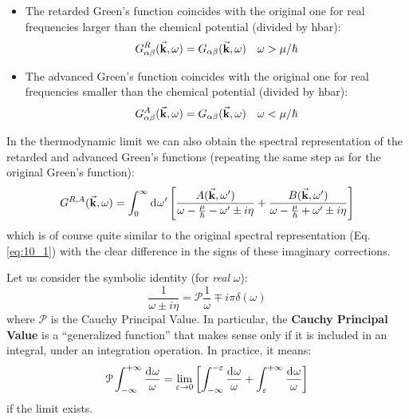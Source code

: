\documentclass[../main/main.tex]{subfiles}
\begin{document}
\begin{itemize}
\item The retarded Green's function coincides with the original one for real frequencies larger than the chemical potential (divided by hbar):
\begin{equation*}
  G_{\alpha \beta }^R (\va{k}, \omega ) = G_{\alpha \beta } (\va{k}, \omega ) \quad \omega > \mu /\hbar
\end{equation*}
\item The advanced Green's function coincides with the original one for real frequencies smaller than the chemical potential (divided by hbar):
\begin{equation*}
  G_{\alpha \beta }^A (\va{k}, \omega ) = G_{\alpha \beta } (\va{k}, \omega ) \quad \omega < \mu /\hbar
\end{equation*}
\end{itemize}
In the thermodynamic limit we can also obtain the spectral representation of the retarded and advanced Green's functions (repeating the same step as for the original Green's function):
\begin{equation}
  G^{R,A} (\va{k}, \omega ) = \int_{0}^{\infty } \dd[]{\omega'}
  \qty[ \frac{A(\va{k},\omega' )}{\omega - \frac{\mu }{\hbar } - \omega' \pm i \eta  }
  +
  \frac{B(\va{k},\omega' )}{\omega - \frac{\mu }{\hbar } + \omega' \pm i \eta  }]
  \label{eq:10_9}
\end{equation}
which is of course quite similar to the original spectral representation (Eq.\eqref{eq:10_1}) with the clear difference in the signs of these imaginary corrections.

Let us consider the symbolic identity (for \emph{real} \( \omega  \)): 
\begin{equation}
  \frac{1}{\omega \pm i \eta } = \mathcal{P} \frac{1}{\omega }\mp i \pi \delta (\omega )
  \label{eq:10_2}
\end{equation}
where \( \mathcal{P} \) is the Cauchy Principal Value.
In particular, the \textbf{Cauchy Principal Value} is a “generalized function” that  makes sense only if it is included in an integral, under an integration operation. In practice, it means:
\begin{equation*}
  \mathcal{P} \int_{-\infty }^{+ \infty } \frac{\dd[]{\omega } }{\omega }
  = \lim_{\varepsilon \rightarrow 0}
  \qty[ \int_{- \infty }^{- \varepsilon } \frac{\dd[]{\omega } }{\omega }
  + \int_{\varepsilon }^{+ \infty } \frac{\dd[]{\omega } }{\omega }   ]
\end{equation*}
if the limit exists.
\end{document}
